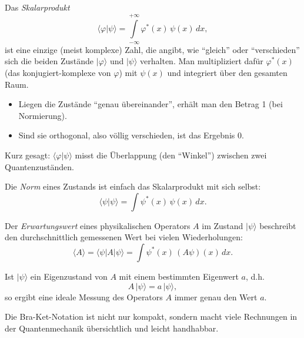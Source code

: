 		Das \emph{Skalarprodukt}
		\begin{equation}
		\langle \varphi | \psi \rangle = \int\limits_{-\infty}^{+\infty} \varphi^*(x)\,\psi(x)\,dx,
		\end{equation}
		ist eine einzige (meist komplexe) Zahl, die angibt, wie ``gleich'' oder ``verschieden'' sich die beiden Zustände $|\varphi\rangle$ und $|\psi\rangle$ verhalten.
		Man multipliziert dafür $\varphi^*(x)$ (das konjugiert-komplexe von $\varphi$) mit $\psi(x)$ und integriert über den gesamten Raum.
		\begin{itemize}
			\item Liegen die Zustände ``genau übereinander'', erhält man den Betrag 1 (bei Normierung).
			\item Sind sie orthogonal, also völlig verschieden, ist das Ergebnis 0.
		\end{itemize}
		Kurz gesagt:
		$\langle \varphi | \psi \rangle$ misst die Überlappung (den ``Winkel'') zwischen zwei Quantenzuständen.

		Die \emph{Norm} eines Zustands ist einfach das Skalarprodukt mit sich selbst:
		\begin{equation}
		\langle \psi | \psi \rangle = \int \psi^*(x)\,\psi(x)\,dx.
		\end{equation}

		Der \emph{Erwartungswert} eines physikalischen Operators $A$ im Zustand $|\psi\rangle$ beschreibt den durchschnittlich gemessenen Wert bei vielen Wiederholungen:
		\begin{equation}
		\langle A \rangle = \langle \psi | A | \psi \rangle = \int \psi^*(x)\,(A\psi)(x)\,dx.
		\end{equation}

		Ist $|\psi\rangle$ ein Eigenzustand von $A$ mit einem bestimmten Eigenwert $a$, d.h.
		\begin{equation}
		A\,|\psi\rangle = a\,|\psi\rangle,
		\end{equation}
		so ergibt eine ideale Messung des Operators $A$ immer genau den Wert $a$.

		Die Bra-Ket-Notation ist nicht nur kompakt, sondern macht viele Rechnungen in der Quantenmechanik übersichtlich und leicht handhabbar.

